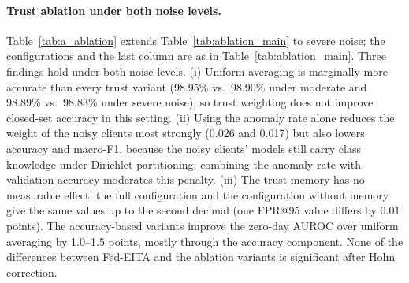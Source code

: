 \documentclass[pdflatex,sn-mathphys-num]{sn-jnl}
\begin{document}
{{{{{\paragraph{Trust ablation under both noise levels.} Table~\ref{tab:a_ablation} extends Table~\ref{tab:ablation_main} to severe noise; the configurations and the last column are as in Table~\ref{tab:ablation_main}. Three findings hold under both noise levels. (i) Uniform averaging is marginally more accurate than every trust variant (98.95\% vs.\ 98.90\% under moderate and 98.89\% vs.\ 98.83\% under severe noise), so trust weighting does not improve closed-set accuracy in this setting. (ii) Using the anomaly rate alone reduces the weight of the noisy clients most strongly (0.026 and 0.017) but also lowers accuracy and macro-F1, because the noisy clients' models still carry class knowledge under Dirichlet partitioning; combining the anomaly rate with validation accuracy moderates this penalty. (iii) The trust memory has no measurable effect: the full configuration and the configuration without memory give the same values up to the second decimal (one FPR@95 value differs by 0.01 points). The accuracy-based variants improve the zero-day AUROC over uniform averaging by 1.0--1.5 points, mostly through the accuracy component. None of the differences between Fed-EITA and the ablation variants is significant after Holm correction.

}}}}}
\end{document}

